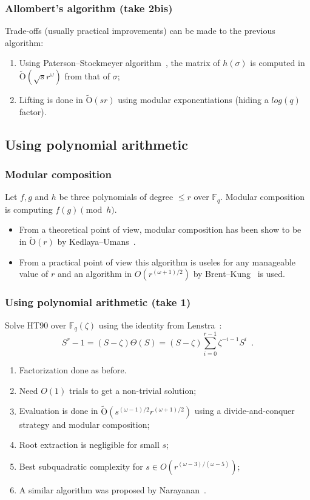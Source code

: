 \documentclass[francais]{beamer}
\def\F {\ensuremath{\mathbb{F}}}
\def\tildO {\ensuremath{\mathrm{\tilde{O}}}}
\begin{document}
\begin{frame}\frametitle{Allombert's algorithm (take 2bis)}
  Trade-offs (usually practical improvements) can be made to the previous algorithm:
  \begin{enumerate}
  \item Using Paterson--Stockmeyer algorithm~\cite{paterson_stockmeyer},
    the matrix of $h(\sigma)$ is computed in $\tildO(\sqrt{s}r^\omega)$
    from that of $\sigma$;
  \item Lifting is done in $\tildO(s r)$ using modular exponentiations (hiding a $log (q)$ factor).
  \end{enumerate}
\end{frame}

\subsection{Using polynomial arithmetic}

\begin{frame}\frametitle{Modular composition}
  Let $f,g$ and $h$ be three polynomials of degree $\leq r$
  over $\F_q$.
  Modular composition is computing $f(g) \pmod{h}$.

  \bigskip
  \begin{itemize}
  \item From a theoretical point of view, modular composition has
  been show to be in $\tildO(r)$ by Kedlaya--Umans~\cite{KeUm11}.
\item From a practical point of view this algorithm is useles
  for any manageable value of $r$ and an algorithm in $O(r^{(\omega+1)/2})$
  by Brent--Kung~\cite{brent+kung} is used.
\end{itemize}
\end{frame}

\begin{frame}\frametitle{Using polynomial arithmetic (take 1)}
  Solve HT90 over $\F_q(\zeta)$ using the identity from Lenstra~\cite{LenstraJr91}:
  \[
    S^r-1 = (S-\zeta) \Theta(S) = (S-\zeta) \sum_{i=0}^{r-1} \zeta^{-i-1}S^i \enspace .
  \]
  \begin{enumerate}
  \item Factorization done as before.
  \item Need $O(1)$ trials to get a non-trivial solution;
  \item Evaluation is done in $\tildO(s^{(\omega-1)/2}r^{(\omega+1)/2})$
    using a divide-and-conquer strategy and modular composition;
  \item Root extraction is negligible for small $s$;
  \item Best subquadratic complexity for $s\in O(r^{(\omega-3)/(\omega-5)})$;
  \item A similar algorithm was proposed by Narayanan~\cite{narayanan2016fast}.
  \end{enumerate}
\end{frame}
\end{document}
